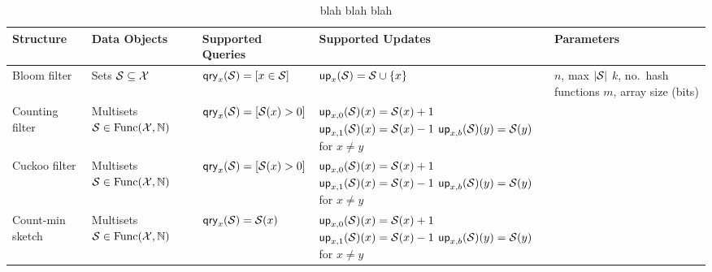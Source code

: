 \begin{table}[thp]
\begin{center}
\small
  \begin{tabular}{ | l | p{2.5cm} | p{3.5cm} | p{4cm} | p{4cm}|}
    \hline
    {\bf Structure} & {\bf Data Objects} & {\bf Supported Queries} & {\bf Supported Updates} & {\bf Parameters} \\ \hline
    Bloom filter 
          & \parbox[c][6ex]{4cm}{Sets\\$\mathcal{S}\subseteq \mathcal{X}$} %
          & $\mathsf{qry}_x(\mathcal{S}) = [x \in \mathcal{S}]$
          &  $\mathsf{up}_x(\mathcal{S}) = \mathcal{S} \cup \{x\}$ 
          & \parbox[c]{4cm}{$n$, max $|\mathcal{S}|$\\$k$, no.\ hash functions\\$m$, array size (bits)} 
          \\\hline
    Counting filter 
          & \parbox[c]{3.5cm}{Multisets\\ $\mathcal{S} \in \mathrm{Func}(\mathcal{X},\mathbb{N})$}
          & $\mathsf{qry}_x(\mathcal{S}) = [\mathcal{S}(x) > 0]$
          & \parbox[c][10ex]{4cm}{$\mathsf{up}_{x,0}(\mathcal{S})(x) = \mathcal{S}(x)+1$ \\ $\mathsf{up}_{x,1}(\mathcal{S})(x) = \mathcal{S}(x)-1$ \\ $\mathsf{up}_{x,b}(\mathcal{S})(y) = \mathcal{S}(y)$ for $x \neq y$}
          &\\ \hline
    Cuckoo filter
          & \parbox[c]{3.5cm}{Multisets\\ $\mathcal{S} \in \mathrm{Func}(\mathcal{X},\mathbb{N})$}
          & $\mathsf{qry}_x(\mathcal{S}) = [\mathcal{S}(x) > 0]$
          & \parbox[c][10ex]{4cm}{$\mathsf{up}_{x,0}(\mathcal{S})(x) = \mathcal{S}(x)+1$ \\ $\mathsf{up}_{x,1}(\mathcal{S})(x) = \mathcal{S}(x)-1$ \\ $\mathsf{up}_{x,b}(\mathcal{S})(y) = \mathcal{S}(y)$ for $x \neq y$}
          & \\ \hline
     Count-min sketch
          & \parbox[c]{3.5cm}{Multisets\\ $\mathcal{S} \in \mathrm{Func}(\mathcal{X},\mathbb{N})$}
          & $\mathsf{qry}_x(\mathcal{S}) = \mathcal{S}(x)$
          & \parbox[c][10ex]{4cm}{$\mathsf{up}_{x,0}(\mathcal{S})(x) = \mathcal{S}(x)+1$ \\ $\mathsf{up}_{x,1}(\mathcal{S})(x) = \mathcal{S}(x)-1$ \\ $\mathsf{up}_{x,b}(\mathcal{S})(y) = \mathcal{S}(y)$ for $x \neq y$}
          & \\ \hline
   
  \end{tabular}
\end{center}
\caption{blah blah blah}
\end{table}

